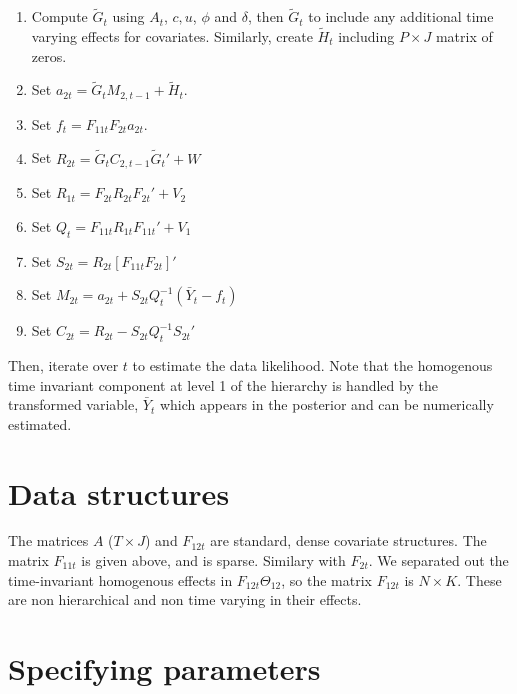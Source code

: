 \documentclass[letter,10pt]{article}
\begin{document}
\begin{enumerate}
\item Compute $\tilde{G}_t$ using $A_t$, $c, u$, $\phi$ and $\delta$, then $\tilde{G}_t$ to include any 
additional time varying effects for covariates. 
Similarly, create $\tilde{H}_t$ including $P\times J$ matrix of zeros.  
\item Set $a_{2t}=\tilde{G}_tM_{2,t-1}+\tilde{H}_t$.
\item Set $f_t=F_{11t}F_{2t}a_{2t}$.
\item Set $R_{2t}=\tilde{G}_tC_{2,t-1}\tilde{G}_t'+W$
\item Set $R_{1t}=F_{2t}R_{2t}F_{2t}'+V_2$
\item Set $Q_t=F_{11t}R_{1t}F_{11t}'+V_1$
\item Set $S_{2t}=R_{2t}\left[F_{11t}F_{2t}\right]'$
\item Set $M_{2t}=a_{2t}+S_{2t}Q_t^{-1}(\bar{Y}_t-f_t)$
\item Set $C_{2t}=R_{2t}-S_{2t}Q_t^{-1}S_{2t}'$
\end{enumerate}
Then, iterate over $t$ to estimate the data likelihood.  Note that the homogenous time invariant component 
at level 1 of the hierarchy is handled by the transformed variable, $\bar{Y}_t$ which appears in the posterior and can 
be numerically estimated.    

\section*{Data structures}

The matrices $A$ ($T\times J$) and $F_{12t}$  are standard, dense covariate structures.  
The matrix $F_{11t}$ is given above, and is sparse.  Similary with $F_{2t}$.  
We separated out the time-invariant homogenous effects in $F_{12t}\Theta_{12}$, so 
the matrix $F_{12t}$ is $N\times K$.  These are non hierarchical and non time varying in their effects.   


\section*{Specifying parameters}
\end{document}
